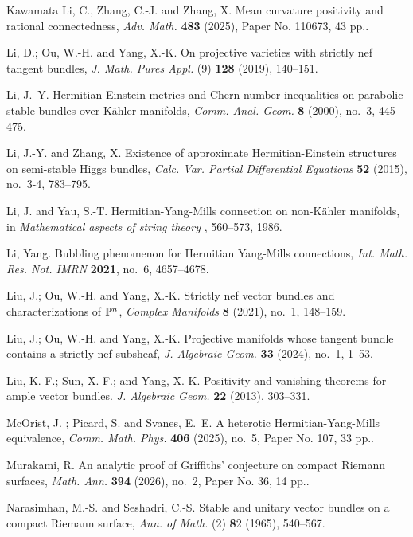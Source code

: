 \documentclass[12pt, reqno]{amsart}
\theoremstyle{plain}
\theoremstyle{definition}
\renewcommand{\>}{\rightarrow}
\renewcommand{\>}{\rightarrow}
\numberwithin{equation}{section} %
\begin{document}
\begin{thebibliography}{Kawamata}
     Li, C., Zhang, C.-J.  and  Zhang, X. Mean curvature positivity and rational connectedness, \emph{Adv. Math.} {\bf 483} (2025), Paper No. 110673, 43 pp..

     Li, D.; Ou, W.-H. and  Yang, X.-K. On projective varieties with strictly nef tangent bundles, \emph{J. Math. Pures Appl.} (9) {\bf 128} (2019), 140--151.

    Li,  J.~Y. Hermitian-Einstein metrics and Chern number inequalities on parabolic stable bundles over K\"ahler manifolds, \emph{Comm. Anal. Geom.} {\bf 8} (2000), no.~3, 445--475.

     Li, J.-Y. and Zhang, X.  Existence of approximate Hermitian-Einstein structures on semi-stable Higgs bundles, \emph{Calc. Var. Partial Differential Equations} {\bf 52} (2015), no.~3-4, 783--795.

    Li, J. and Yau, S.-T.  Hermitian-Yang-Mills connection on non-K\"ahler manifolds, in {\it Mathematical aspects of string theory }, 560--573, 1986.

     Li, Yang. Bubbling phenomenon for Hermitian Yang-Mills connections, \emph{Int. Math. Res. Not. IMRN} {\bf 2021}, no.~6, 4657--4678.



     Liu, J.; Ou, W.-H. and  Yang, X.-K. Strictly nef vector bundles and characterizations of $\Bbb{P}^n$, \emph{Complex Manifolds }{\bf 8} (2021), no.~1, 148--159.

 Liu, J.; Ou, W.-H. and  Yang, X.-K. Projective manifolds whose tangent bundle contains a strictly nef subsheaf, \emph{J. Algebraic Geom.} {\bf 33} (2024), no.~1, 1--53.

     Liu, K.-F.; Sun, X.-F.; and  Yang, X.-K. Positivity and vanishing theorems for ample vector bundles. \emph{J. Algebraic Geom.} \textbf{22} (2013), 303--331.


    McOrist, J. ;  Picard, S. and  Svanes,  E.~E. A heterotic Hermitian-Yang-Mills equivalence, \emph{Comm. Math. Phys.} {\bf 406} (2025), no.~5, Paper No. 107, 33 pp..

    Murakami, R. An analytic proof of Griffiths' conjecture on compact Riemann surfaces, \emph{Math. Ann.} {\bf 394} (2026), no.~2, Paper No. 36, 14 pp..


    Narasimhan, M.-S.  and  Seshadri, C.-S.  Stable and unitary vector bundles on a compact Riemann surface,  \emph{Ann. of Math.} (2) {\textbf 82} (1965), 540--567.


\end{thebibliography}
\end{document}
